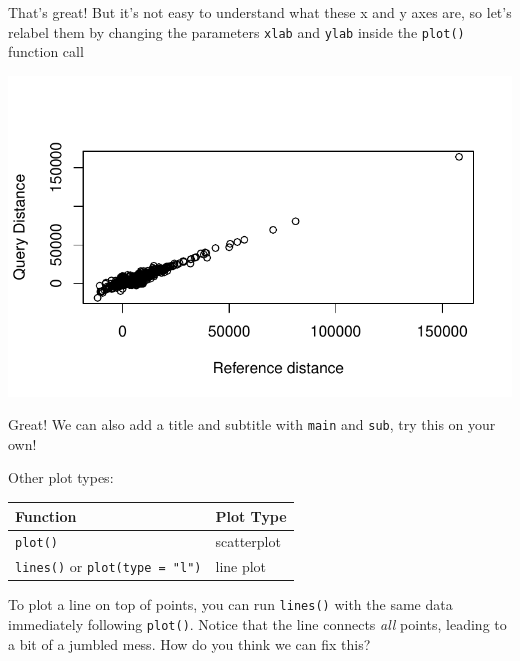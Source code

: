 \documentclass[
  letterpaper,
  DIV=11,
  numbers=noendperiod]{scrreprt}
\newenvironment{Shaded}{\begin{snugshade}}{\end{snugshade}}
\newcommand{\AttributeTok}[1]{\textcolor[rgb]{0.40,0.45,0.13}{#1}}
\newcommand{\DocumentationTok}[1]{\textcolor[rgb]{0.37,0.37,0.37}{\textit{#1}}}
\newcommand{\FunctionTok}[1]{\textcolor[rgb]{0.28,0.35,0.67}{#1}}
\newcommand{\NormalTok}[1]{\textcolor[rgb]{0.00,0.23,0.31}{#1}}
\newcommand{\SpecialCharTok}[1]{\textcolor[rgb]{0.37,0.37,0.37}{#1}}
\newcommand{\StringTok}[1]{\textcolor[rgb]{0.13,0.47,0.30}{#1}}
\begin{document}
That's great! But it's not easy to understand what these x and y axes
are, so let's relabel them by changing the parameters \texttt{xlab} and
\texttt{ylab} inside the \texttt{plot()} function call

\begin{Shaded}
\end{Shaded}

\includegraphics{scripts/02_dataViz/class3_files/figure-pdf/unnamed-chunk-4-1.pdf}

Great! We can also add a title and subtitle with \texttt{main} and
\texttt{sub}, try this on your own!

Other plot types:

\begin{longtable}[]{@{}ll@{}}
\toprule\noalign{}
Function & Plot Type \\
\midrule\noalign{}
\endhead
\bottomrule\noalign{}
\endlastfoot
\texttt{plot()} & scatterplot \\
\texttt{lines()} or \texttt{plot(type\ =\ "l")} & line plot \\
\end{longtable}

To plot a line on top of points, you can run \texttt{lines()} with the
same data immediately following \texttt{plot()}. Notice that the line
connects \emph{all} points, leading to a bit of a jumbled mess. How do
you think we can fix this?
\end{document}
